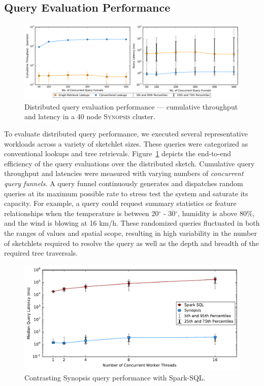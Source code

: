 \subsection{Query Evaluation Performance}
\begin{figure}
    \centerline{\includegraphics[width=\linewidth]{figures/query_benchmark_both.pdf}}
    \caption{Distributed query evaluation performance --- cumulative throughput and latency in a 40 node \textsc{Synopsis} cluster.}
    \label{fig:dist-query}
\end{figure}
To evaluate distributed query performance, we executed several representative workloads across a variety of sketchlet sizes. These queries were categorized as conventional lookups and tree retrievals.  Figure~\ref{fig:dist-query} depicts the end-to-end efficiency of the query evaluations over the distributed sketch.
Cumulative query throughput and latencies were measured with varying numbers of \emph{concurrent query funnels}.
A query funnel continuously generates and dispatches random queries at its maximum possible rate to stress test the system and saturate its capacity. For example, a query could request summary statistics or feature relationships when the temperature is between 20$^{\circ}$ - 30$^{\circ}$, humidity is above 80\%, and the wind is blowing at 16 km/h.
These randomized queries fluctuated in both the ranges of values and spatial scope, resulting in high variability in the number of sketchlets required to resolve the query as well as the depth and breadth of the required tree traversals.
%
\begin{figure}
    \centerline{\includegraphics[width=\linewidth]{figures/spark-sql-query-complete.pdf}}
    \caption{Contrasting Synopsis query performance with Spark-SQL.}
    \label{fig:spark-sql-query}
\end{figure}
%

